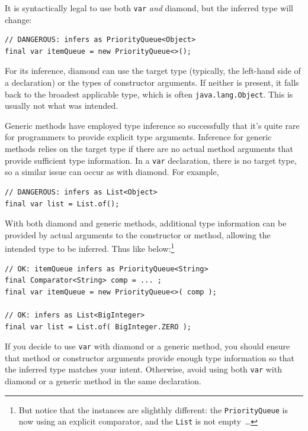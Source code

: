 \documentclass[11pt,a4paper, titlepage, parskip=half, headsepline, footsepline, cleardoublepage=current, headheight=1cm]{scrbook}
\begin{document}
It is syntactically legal to use both \lstinline|var| \textit{and} diamond, but the inferred type will change:
\begin{lstlisting}
// DANGEROUS: infers as PriorityQueue<Object>
final var itemQueue = new PriorityQueue<>();
\end{lstlisting}

For its inference, diamond can use the target type (typically, the left-hand side of a declaration) or the types of constructor arguments. If neither is present, it falls back to the broadest applicable type, which is often \lstinline|java.lang.Object|. This is usually not what was intended.

Generic methods have employed type inference so successfully that it’s quite rare for programmers to provide explicit type arguments. Inference for generic methods relies on the target type if there are no actual method arguments that provide sufficient type information. In a \lstinline|var| declaration, there is no target type, so a similar issue can occur as with diamond. For example,
\begin{lstlisting}
// DANGEROUS: infers as List<Object>
final var list = List.of();
\end{lstlisting}

With both diamond and generic methods, additional type information can be provided by actual arguments to the constructor or method, allowing the intended type to be inferred. Thus like below:\footnote{But notice that the instances are slighthly different: the \lstinline|PriorityQueue| is now using an explicit comparator, and the \lstinline|List| is not empty~…}
\begin{lstlisting}
// OK: itemQueue infers as PriorityQueue<String>
final Comparator<String> comp = ... ;
final var itemQueue = new PriorityQueue<>( comp );

// OK: infers as List<BigInteger>
final var list = List.of( BigInteger.ZERO );
\end{lstlisting}

If you decide to use \lstinline|var| with diamond or a generic method, you should ensure that method or constructor arguments provide enough type information so that the inferred type matches your intent. Otherwise, avoid using both \lstinline|var| with diamond or a generic method in the same declaration.
\end{document}
